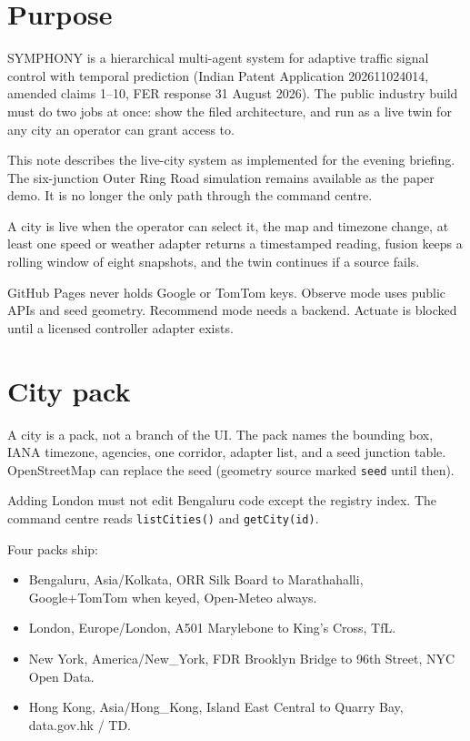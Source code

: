 \documentclass[listings]{csf301-notes}
\begin{document}
\notestitle

\section{Purpose}
SYMPHONY is a hierarchical multi-agent system for adaptive traffic signal
control with temporal prediction (Indian Patent Application 202611024014,
amended claims 1--10, FER response 31 August 2026). The public industry
build must do two jobs at once: show the filed architecture, and run as a
live twin for any city an operator can grant access to.

This note describes the live-city system as implemented for the evening
briefing. The six-junction Outer Ring Road simulation remains available as
the paper demo. It is no longer the only path through the command centre.

\begin{definition}
A city is live when the operator can select it, the map and timezone change,
at least one speed or weather adapter returns a timestamped reading, fusion
keeps a rolling window of eight snapshots, and the twin continues if a
source fails.
\end{definition}

\begin{warning}
GitHub Pages never holds Google or TomTom keys. Observe mode uses public
APIs and seed geometry. Recommend mode needs a backend. Actuate is blocked
until a licensed controller adapter exists.
\end{warning}

\section{City pack}
A city is a pack, not a branch of the UI. The pack names the bounding box,
IANA timezone, agencies, one corridor, adapter list, and a seed junction
table. OpenStreetMap can replace the seed (geometry source marked
\texttt{seed} until then).

\begin{keyidea}
Adding London must not edit Bengaluru code except the registry index. The
command centre reads \texttt{listCities()} and \texttt{getCity(id)}.
\end{keyidea}

Four packs ship:

\begin{itemize}
\item Bengaluru, Asia/Kolkata, ORR Silk Board to Marathahalli, Google+TomTom
      when keyed, Open-Meteo always.
\item London, Europe/London, A501 Marylebone to King's Cross, TfL.
\item New York, America/New\_York, FDR Brooklyn Bridge to 96th Street,
      NYC Open Data.
\item Hong Kong, Asia/Hong\_Kong, Island East Central to Quarry Bay,
      data.gov.hk / TD.
\end{itemize}
\end{document}
